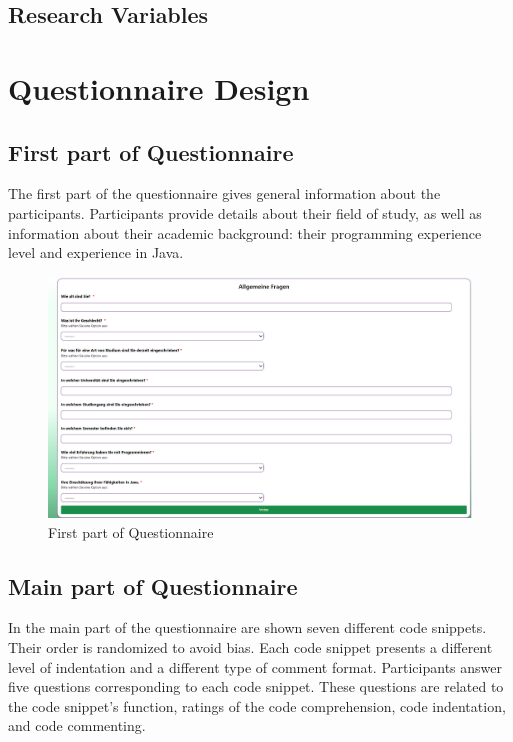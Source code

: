 \subsection{Research Variables}



\section{Questionnaire Design}


\subsection{First part of Questionnaire}
The first part of the questionnaire gives general information about the participants. 
Participants provide details about their field of study, as well as information about their academic background: their programming experience level and experience in Java.

\begin{figure} [H]
  \centering
  \includegraphics[scale=0.45]{figures/allgemein.png}
  \caption{First part of Questionnaire}
  \label{fig:AnhangsChor}
\end{figure}


\subsection{Main part of Questionnaire}

In the main part of the questionnaire are shown seven different code snippets. Their order is randomized to avoid bias. Each code snippet presents a different level of indentation and a different type of comment format.
Participants answer five questions corresponding to each code snippet. These questions are related to the code snippet’s function, ratings of the code comprehension, code indentation, and code commenting.


